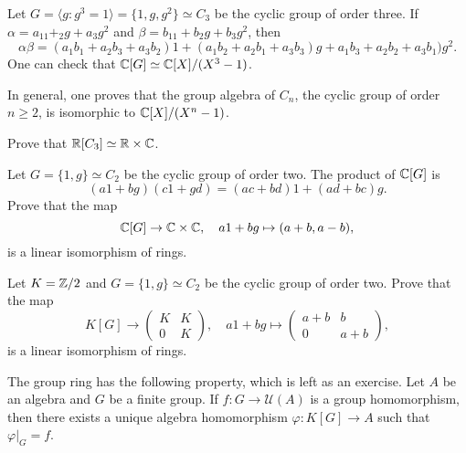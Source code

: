 \begin{example}
	Let $G=\langle g:g^3=1\rangle=\{1,g,g^2\}\simeq C_3$ be the cyclic group of order three. 
	If $\alpha=a_11+_2g+a_3g^2$ and $\beta=b_11+b_2g+b_3g^2$, then
	\[
		\alpha\beta=(a_1b_1+a_2b_3+a_3b_2)1+(a_1b_2+a_2b_1+a_3b_3)g+a_1b_3+a_2b_2+a_3b_1)g^2.
	\]
	One can check that $\mathbb{C}[G]\simeq\mathbb{C}[X]/(X^3-1)$. 
\end{example}

In general, one proves that the group algebra of $C_n$, the cyclic group of order $n\geq2$, 
is isomorphic to $\mathbb{C}[X]/(X^n-1)$.

\begin{exercise}
\label{xca:RC3}
	Prove that $\mathbb{R}[C_3]\simeq\mathbb{R}\times\mathbb{C}$. 	
\end{exercise}

\begin{exercise}
	Let $G=\{1,g\}\simeq C_2$ be the cyclic group of order two. The product
	of $\mathbb{C}[G]$ is 
	\[
	(a1+bg)(c1+gd)=(ac+bd)1+(ad+bc)g.
	\]
	Prove that the map 
 \[
 \mathbb{C}[G]\to \mathbb{C}\times \mathbb{C},\quad a1+bg\mapsto (a+b,a-b),
 \]
	is a linear isomorphism of rings. 
\end{exercise}

\begin{exercise}
	Let $K=\mathbb{Z}/2$ and $G=\{1,g\}\simeq C_2$ be the cyclic group of order two. 
	Prove that the map 
 \[
 K[G]\to\begin{pmatrix}
		K&K\\
		0&K
	\end{pmatrix},\quad 
 a1+bg\mapsto\begin{pmatrix}
		a+b&b\\
		0&a+b		
	\end{pmatrix},
    \]
    is a linear isomorphism of rings.
\end{exercise}

The group ring has the following property, which is left as an exercise. 
Let $A$ be an algebra and
$G$ be a finite group. If $f\colon G\to\mathcal{U}(A)$ is a group homomorphism, 
then there exists a unique algebra homomorphism $\varphi\colon K[G]\to A$ such that
$\varphi|_G=f$. 

